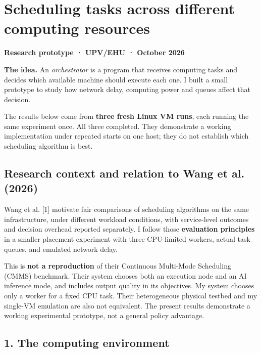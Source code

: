 \documentclass[11pt,a4paper]{article}
\begin{document}
\section{Scheduling tasks across different computing
resources}\label{scheduling-tasks-across-different-computing-resources}

\textbf{Research prototype · UPV/EHU · October 2026}

\textbf{The idea.} An \emph{orchestrator} is a program that receives
computing tasks and decides which available machine should execute each
one. I built a small prototype to study how network delay, computing
power and queues affect that decision.

The results below come from \textbf{three fresh Linux VM runs}, each
running the same experiment once. All three completed. They demonstrate
a working implementation under repeated starts on one host; they do not
establish which scheduling algorithm is best.

\subsection{Research context and relation to Wang et al.
(2026)}\label{research-context-and-relation-to-wang-et-al.-2026}

Wang et al. {[}1{]} motivate fair comparisons of scheduling algorithms
on the same infrastructure, under different workload conditions, with
service-level outcomes and decision overhead reported separately. I
follow those \textbf{evaluation principles} in a smaller placement
experiment with three CPU-limited workers, actual task queues, and
emulated network delay.

This is \textbf{not a reproduction} of their Continuous Multi-Mode
Scheduling (CMMS) benchmark. Their system chooses both an execution node
and an AI inference mode, and includes output quality in its objectives.
My system chooses only a worker for a fixed CPU task. Their
heterogeneous physical testbed and my single-VM emulation are also not
equivalent. The present results demonstrate a working experimental
prototype, not a general policy advantage.

\subsection{1. The computing
environment}\label{the-computing-environment}
\end{document}
